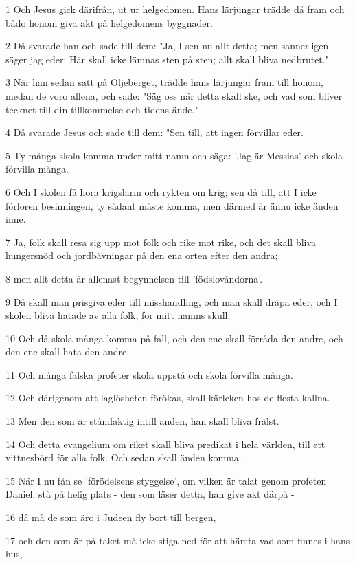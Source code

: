 \par 1 Och Jesus gick därifrån, ut ur helgedomen. Hans lärjungar trädde då fram och bådo honom giva akt på helgedomens byggnader.
\par 2 Då svarade han och sade till dem: "Ja, I sen nu allt detta; men sannerligen säger jag eder: Här skall icke lämnas sten på sten; allt skall bliva nedbrutet."
\par 3 När han sedan satt på Oljeberget, trädde hans lärjungar fram till honom, medan de voro allena, och sade: "Säg oss när detta skall ske, och vad som bliver tecknet till din tillkommelse och tidens ände."
\par 4 Då svarade Jesus och sade till dem: "Sen till, att ingen förvillar eder.
\par 5 Ty många skola komma under mitt namn och säga: 'Jag är Messias' och skola förvilla många.
\par 6 Och I skolen få höra krigslarm och rykten om krig; sen då till, att I icke förloren besinningen, ty sådant måste komma, men därmed är ännu icke änden inne.
\par 7 Ja, folk skall resa sig upp mot folk och rike mot rike, och det skall bliva hungersnöd och jordbävningar på den ena orten efter den andra;
\par 8 men allt detta är allenast begynnelsen till 'födslovåndorna'.
\par 9 Då skall man prisgiva eder till misshandling, och man skall dräpa eder, och I skolen bliva hatade av alla folk, för mitt namns skull.
\par 10 Och då skola många komma på fall, och den ene skall förråda den andre, och den ene skall hata den andre.
\par 11 Och många falska profeter skola uppstå och skola förvilla många.
\par 12 Och därigenom att laglösheten förökas, skall kärleken hos de flesta kallna.
\par 13 Men den som är ståndaktig intill änden, han skall bliva frälst.
\par 14 Och detta evangelium om riket skall bliva predikat i hela världen, till ett vittnesbörd för alla folk. Och sedan skall änden komma.
\par 15 När I nu fån se 'förödelsens styggelse', om vilken är talat genom profeten Daniel, stå på helig plats - den som läser detta, han give akt därpå -
\par 16 då må de som äro i Judeen fly bort till bergen,
\par 17 och den som är på taket må icke stiga ned för att hämta vad som finnes i hans hus,

